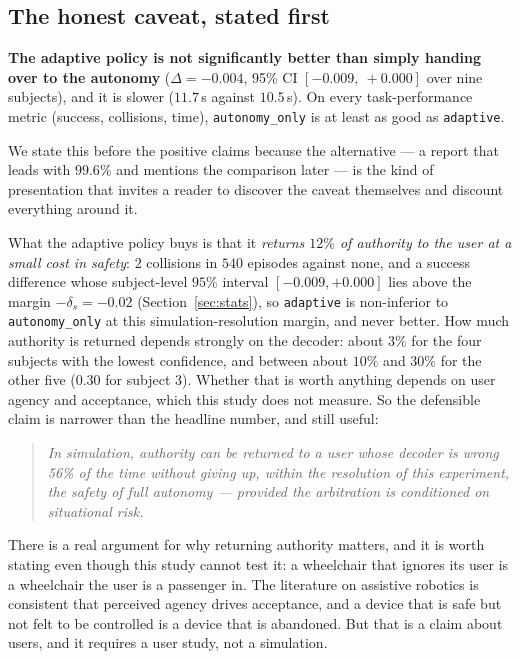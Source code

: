 \documentclass[11pt,a4paper]{article}
\newcommand{\vauto}{\texttt{autonomy\_only}}
\newcommand{\vadapt}{\texttt{adaptive}}
\theoremstyle{plain}
\theoremstyle{definition}
\begin{document}
\subsection{The honest caveat, stated first}
\label{sec:honest}

\textbf{The adaptive policy is not significantly better than simply
handing over to the autonomy} ($\Delta = -0.004$, 95\% CI
$[-0.009,\ +0.000]$ over nine subjects), and it is slower ($11.7$\,s
against $10.5$\,s). On every task-performance metric
(success, collisions, time), \vauto{} is at least as good as \vadapt{}.

We state this before the positive claims because the alternative --- a
report that leads with $99.6\%$ and mentions the comparison later --- is
the kind of presentation that invites a reader to discover the caveat
themselves and discount everything around it.

What the adaptive policy buys is that it \emph{returns $12\%$ of
authority to the user at a small cost in safety}: $2$ collisions in
$540$ episodes against none, and a success difference whose
subject-level $95\%$ interval $[-0.009, +0.000]$ lies above the margin
$-\delta_s = -0.02$ (Section~\ref{sec:stats}), so \vadapt{} is
non-inferior to \vauto{} at this simulation-resolution margin, and never
better. How much authority is returned depends strongly on the decoder:
about $3\%$ for the four subjects with the lowest confidence, and
between about $10\%$ and $30\%$ for the other five ($0.30$ for
subject 3). Whether that is
worth anything depends on user agency and acceptance, which this study
does not measure. So the defensible claim is narrower than the headline
number, and still useful:

\begin{quote}
\itshape
In simulation, authority can be returned to a user whose decoder is
wrong 56\% of the time without giving up, within the resolution of this
experiment, the safety of full autonomy --- provided the arbitration is
conditioned on situational risk.
\end{quote}

There is a real argument for why returning authority matters, and it is
worth stating even though this study cannot test it: a wheelchair that
ignores its user is a wheelchair the user is a passenger in. The
literature on assistive robotics is consistent that perceived agency
drives acceptance, and a device that is safe but not felt to be
controlled is a device that is abandoned. But that is a claim about
users, and it requires a user study, not a simulation.
\end{document}
